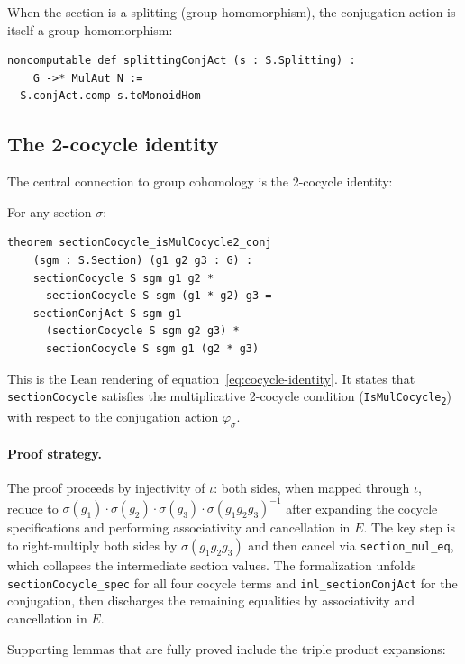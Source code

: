 \documentclass[11pt]{article}
\newcommand{\lean}[1]{\texttt{#1}}
\newcommand{\IsMulCocycle}{\lean{IsMulCocycle\textsubscript{2}}}
\begin{document}
When the section is a splitting (group homomorphism), the conjugation action
is itself a group homomorphism:

\begin{lstlisting}
noncomputable def splittingConjAct (s : S.Splitting) :
    G ->* MulAut N :=
  S.conjAct.comp s.toMonoidHom
\end{lstlisting}

\subsection{The 2-cocycle identity}\label{sec:cocycle-identity}

The central connection to group cohomology is the 2-cocycle identity:

\begin{theorem}\label{thm:cocycle-identity}
For any section $\sigma$:
\begin{lstlisting}
theorem sectionCocycle_isMulCocycle2_conj
    (sgm : S.Section) (g1 g2 g3 : G) :
    sectionCocycle S sgm g1 g2 *
      sectionCocycle S sgm (g1 * g2) g3 =
    sectionConjAct S sgm g1
      (sectionCocycle S sgm g2 g3) *
      sectionCocycle S sgm g1 (g2 * g3)
\end{lstlisting}
\end{theorem}

\noindent
This is the Lean rendering of equation~\eqref{eq:cocycle-identity}.  It states that
\lean{sectionCocycle} satisfies the multiplicative 2-cocycle condition
(\IsMulCocycle{}) with respect to the conjugation action
$\varphi_\sigma$.

\paragraph{Proof strategy.}
The proof proceeds by injectivity of $\iota$: both sides, when mapped through
$\iota$, reduce to $\sigma(g_1) \cdot \sigma(g_2) \cdot \sigma(g_3) \cdot
\sigma(g_1 g_2 g_3)^{-1}$ after expanding the cocycle specifications and
performing associativity and cancellation in $E$.  The key step is to
right-multiply both sides by $\sigma(g_1 g_2 g_3)$ and then cancel via
\lean{section\_mul\_eq}, which collapses the intermediate section values.
The formalization unfolds \lean{sectionCocycle\_spec} for all four cocycle terms
and \lean{inl\_sectionConjAct} for the conjugation, then discharges the remaining
equalities by associativity and cancellation in $E$.

Supporting lemmas that are fully proved include the triple product expansions:
\end{document}
